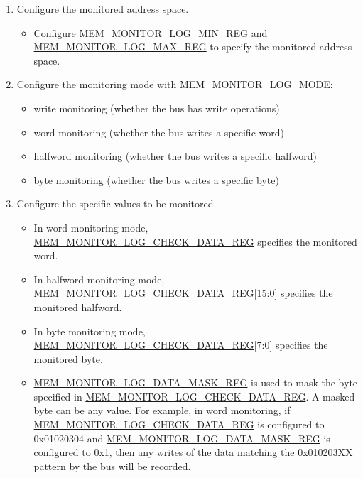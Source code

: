 \documentclass[main\_\_EN.tex]{subfiles}
\begin{document}
\begin{enumerate}

\item Configure the monitored address space.
      \begin{itemize}
         \item Configure \hyperref[regdesc:MEMMONITORLOGMINREG]{MEM\_MONITOR\_LOG\_MIN\_REG} and \hyperref[regdesc:MEMMONITORLOGMAXREG]{MEM\_MONITOR\_LOG\_MAX\_REG} to specify the monitored address space.
      \end{itemize}

\item Configure the monitoring mode with \hyperref[fielddesc:MEMMONITORLOGMODE]{MEM\_MONITOR\_LOG\_MODE}:
       \begin{itemize}
           \item write monitoring (whether the bus has write operations)
           \item word monitoring (whether the bus writes a specific word)
           \item halfword monitoring (whether the bus writes a specific halfword)
           \item byte monitoring (whether the bus writes a specific byte)
       \end{itemize}
       
\item Configure the specific values to be monitored.
       \begin{itemize}
            \item In word monitoring mode, \hyperref[regdesc:MEMMONITORLOGCHECKDATAREG]{MEM\_MONITOR\_LOG\_CHECK\_DATA\_REG} specifies the monitored word.
            \item In halfword monitoring mode, \hyperref[regdesc:MEMMONITORLOGCHECKDATAREG]{MEM\_MONITOR\_LOG\_CHECK\_DATA\_REG}[15:0] specifies the monitored halfword.
            \item In byte monitoring mode, \hyperref[regdesc:MEMMONITORLOGCHECKDATAREG]{MEM\_MONITOR\_LOG\_CHECK\_DATA\_REG}[7:0] specifies the monitored byte.
            \item \hyperref[regdesc:MEMMONITORLOGDATAMASKREG]{MEM\_MONITOR\_LOG\_DATA\_MASK\_REG} is used to mask the byte specified in \hyperref[regdesc:MEMMONITORLOGCHECKDATAREG]{MEM\_MONITOR\_LOG\_CHECK\_DATA\_REG}. A masked byte can be any value. For example, in word monitoring, if \hyperref[regdesc:MEMMONITORLOGCHECKDATAREG]{MEM\_MONITOR\_LOG\_CHECK\_DATA\_REG} is configured to 0x01020304 and \hyperref[regdesc:MEMMONITORLOGDATAMASKREG]{MEM\_MONITOR\_LOG\_DATA\_MASK\_REG} is configured to 0x1, then any writes of the data matching the 0x010203XX pattern by the bus will be recorded.
       \end{itemize}
       

\end{enumerate}
\end{document}
